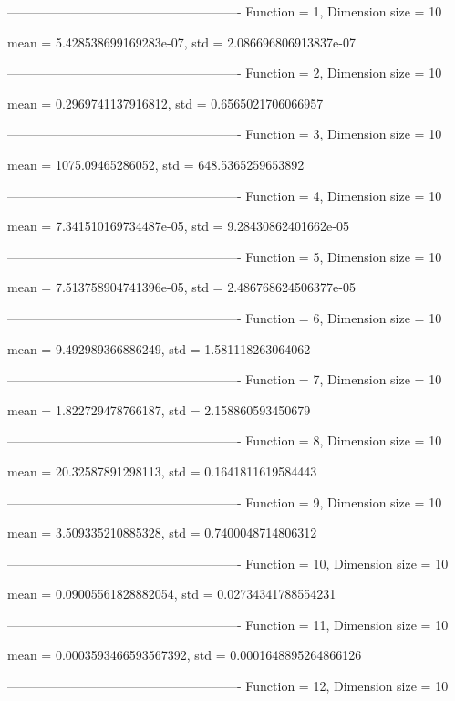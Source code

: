 -------------------------------------------------------
Function = 1, Dimension size = 10


mean = 5.428538699169283e-07, std = 2.086696806913837e-07

-------------------------------------------------------
Function = 2, Dimension size = 10


mean = 0.2969741137916812, std = 0.6565021706066957

-------------------------------------------------------
Function = 3, Dimension size = 10


mean = 1075.09465286052, std = 648.5365259653892

-------------------------------------------------------
Function = 4, Dimension size = 10


mean = 7.341510169734487e-05, std = 9.28430862401662e-05

-------------------------------------------------------
Function = 5, Dimension size = 10


mean = 7.513758904741396e-05, std = 2.486768624506377e-05

-------------------------------------------------------
Function = 6, Dimension size = 10


mean = 9.492989366886249, std = 1.581118263064062

-------------------------------------------------------
Function = 7, Dimension size = 10


mean = 1.822729478766187, std = 2.158860593450679

-------------------------------------------------------
Function = 8, Dimension size = 10


mean = 20.32587891298113, std = 0.1641811619584443

-------------------------------------------------------
Function = 9, Dimension size = 10


mean = 3.509335210885328, std = 0.7400048714806312

-------------------------------------------------------
Function = 10, Dimension size = 10


mean = 0.09005561828882054, std = 0.02734341788554231

-------------------------------------------------------
Function = 11, Dimension size = 10


mean = 0.0003593466593567392, std = 0.0001648895264866126

-------------------------------------------------------
Function = 12, Dimension size = 10


